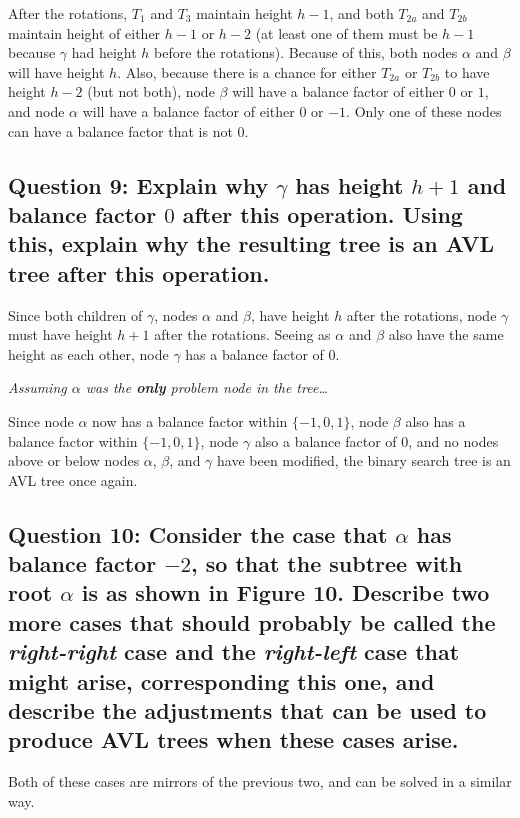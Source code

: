 \documentclass[a4paper, 12pt, titlepage]{article}
\begin{document}
After the rotations,
$T_1$ and $T_3$ maintain height $h-1$,
and both $T_{2a}$ and $T_{2b}$ maintain height of either $h-1$ or $h-2$
(at least one of them must be $h-1$ because $\gamma$ had height $h$ before the rotations).
Because of this,
both nodes $\alpha$ and $\beta$ will have height $h$.
Also,
because there is a chance for either $T_{2a}$ or $T_{2b}$ to have height $h-2$
(but not both),
node $\beta$ will have a balance factor of either $0$ or $1$,
and node $\alpha$ will have a balance factor of either $0$ or $-1$.
Only one of these nodes can have a balance factor that is not $0$.

\subsection*{Question 9: Explain why $\gamma$ has height $h+1$ and balance factor $0$ after this operation. Using this, explain why the resulting tree is an AVL tree after this operation.} 

Since both children of $\gamma$,
nodes $\alpha$ and $\beta$,
have height $h$ after the rotations,
node $\gamma$ must have height $h+1$ after the rotations.
Seeing as $\alpha$ and $\beta$ also have the same height as each other,
node $\gamma$ has a balance factor of $0$.

\textit{Assuming $\alpha$ was the \textbf{only} problem node in the tree\ldots}

Since node $\alpha$ now has a balance factor within $\{−1, 0, 1\}$,
node $\beta$ also has a balance factor within $\{−1, 0, 1\}$,
node $\gamma$ also a balance factor of $0$,
and no nodes above or below nodes $\alpha$, $\beta$, and $\gamma$ have been modified,
the binary search tree is an AVL tree once again.

\subsection*{Question 10: Consider the case that $\alpha$ has balance factor $-2$, so that the subtree with root $\alpha$ is as shown in Figure 10. Describe two more cases that should probably be called the \textit{right-right} case and the \textit{right-left} case that might arise, corresponding this one, and describe the adjustments that can be used to produce AVL trees when these cases arise.} 

Both of these cases are mirrors of the previous two,
and can be solved in a similar way.
\end{document}
